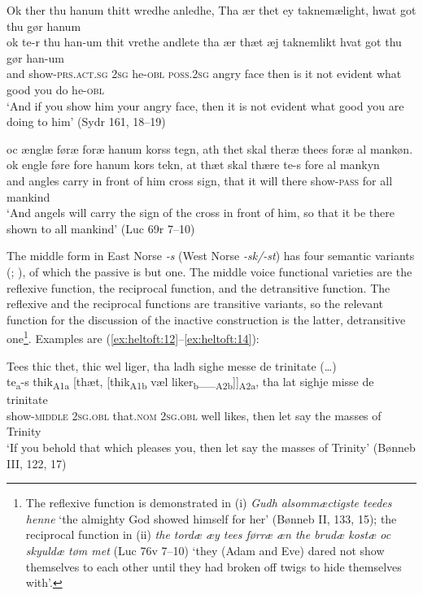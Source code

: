 \documentclass[output=paper]{langscibook}
\begin{document}
\begin{exe}
\ex \label{ex:heltoft:10}
    \glll Ok ther thu hanum thitt wredhe anledhe, Tha ær thet  ey taknemælight, hwat     got thu gør hanum \\
         ok    te-r           thu    han-um    thit        vrethe  andlete  tha    ær    thæt   æj    taknemlikt    hvat got    thu  gør  han-um\\
         and  show-\textsc{prs.act.sg}    \textsc{2sg}  he-\textsc{obl}    \textsc{poss.2sg}  angry  face then  is     it     not  evident      what good    you do he-\textsc{obl}\\
    \glt `And if you show him your angry face, then it is not evident what good you are doing to him' (Sydr 161, 18--19)

\ex \label{ex:heltoft:11}
    \glll oc ænglæ føræ foræ hanum korss tegn, ath thet skal theræ thees foræ al mankøn. \\
         ok  engle føre fore hanum    kors tekn,  at    thæt    skal  thære    te-s      fore  al  mankyn\\
         and angles carry {in front of} him   cross sign, that  it      will  there    show-\textsc{pass}  for    all  mankind\\
    \glt `And angels will carry the sign of the cross in front of him, so that it be there shown to all mankind' (Luc 69r 7--10)
\end{exe}

The middle form in East Norse \textit{{}-s} (West Norse \textit{{}-sk/-st}) has four semantic variants (\citealt{Dyvik1980}; \citealt{Heltoft2006}), of which the passive is but one. The middle voice functional varieties are the reflexive function, the reciprocal function, and the detransitive function. The reflexive and the reciprocal functions are transitive variants, so the relevant function for the discussion of the inactive construction is the latter, detransitive one\footnote{The reflexive function is demonstrated in (i) \textit{Gudh alsommæctigste teedes henne} ‘the almighty God showed himself for her' (Bønneb II, 133, 15); the reciprocal function in (ii) \textit{the tordæ æy tees førræ æn the brudæ kostæ oc skyuldæ tøm met} (Luc 76v 7--10) ‘they (Adam and Eve) dared not show themselves to each other until they had broken off twigs to hide themselves with'.}. Examples are (\ref{ex:heltoft:12}--\ref{ex:heltoft:14}):

\begin{exe}
\ex \label{ex:heltoft:12} 
    \glll Tees thic thet, thic wel liger, tha ladh sighe messe de trinitate (…) \\
         te\textsubscript{a}{}-s     thik\textsubscript{A1a}  [thæt,     [thik\textsubscript{A1b}    væl liker\textsubscript{b}\_\_\textsubscript{A2b}]]\textsubscript{A2a}, tha lat sighje   misse de trinitate\\
         show-\textsc{middle}  \textsc{2sg.obl}   that.\textsc{nom}  \textsc{2sg.obl}    well likes, then let say  {the masses} of Trinity \\
    \glt `If you behold that which pleases you, then let say the masses of Trinity' (Bønneb III, 122, 17)
\end{exe}
\end{document}
